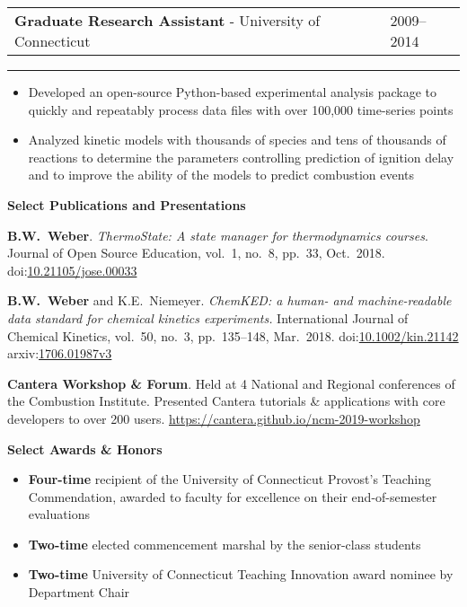 \documentclass[11pt]{article}
\newcommand{\cvsection}[1]
{
\begin{center}
    \large\textcolor{sectcol}{\textbf{#1}}
\end{center}
}
\newenvironment{cvevent}[3]{%
%
\begin{tabular*}{1\textwidth}{p{13.9cm} x{3.04cm}}%
    \textbf{#2} - \textcolor{bgcol}{#3} & \vspace{2.5pt}\textcolor{sectcol}{#1}%
\end{tabular*}%

\vspace{-8pt}%
\textcolor{softcol}{\hrule}%
\vspace{6pt}%
}{
\vspace{6pt}
}
\newcommand*{\meauthor}[1]{\textbf{#1}}
\newcommand*{\papertitle}[1]{\textit{#1}}
\newcommand{\iconspace}{\enspace}
\newcommand{\arxiv}[1]{\aiarXiv\iconspace arxiv:\href{https://arxiv.org/abs/#1}{#1}}
\newcommand{\doi}[1]{\aiDoi\iconspace doi:\href{https://doi.org/#1}{#1}}
\begin{document}
\begin{cvevent}{2009--2014}
{Graduate Research Assistant}
{University of Connecticut}
\begin{itemize}
    \item Developed an open-source Python-based experimental analysis package to quickly
    and repeatably process data files with over 100,000 time-series points
    \item Analyzed kinetic models with thousands of species and tens of thousands of
    reactions to determine the parameters controlling prediction of ignition delay and to
    improve the ability of the models to predict combustion events
\end{itemize}
\end{cvevent}

\cvsection{Select Publications and Presentations}

\meauthor{B.W.\ Weber}. \papertitle{ThermoState: A state manager for thermodynamics
courses}. Journal of Open Source Education, vol.\ 1, no.\ 8, pp.\ 33,
Oct.\ 2018.
\doi{10.21105/jose.00033}

\meauthor{B.W.\ Weber} and K.E.\ Niemeyer. \papertitle{ChemKED: a human- and
machine-readable data standard for chemical kinetics experiments.} International Journal
of Chemical Kinetics, vol.\ 50, no.\ 3, pp.\ 135--148, Mar.\ 2018.
\doi{10.1002/kin.21142} \quad \arxiv{1706.01987v3}

\textbf{Cantera Workshop \& Forum}. Held at 4 National and Regional conferences of the Combustion
Institute. Presented Cantera tutorials \& applications with core developers to over 200
users. \url{https://cantera.github.io/ncm-2019-workshop}


\cvsection{Select Awards \& Honors}

\begin{itemize}[leftmargin=*]
    \item \textbf{Four-time} recipient of the University of Connecticut Provost's Teaching
    Commendation, awarded to faculty for excellence on their end-of-semester evaluations
    \item \textbf{Two-time} elected commencement marshal by the senior-class students
    \item \textbf{Two-time} University of Connecticut Teaching Innovation award nominee by
    Department Chair
\end{itemize}
\end{document}
